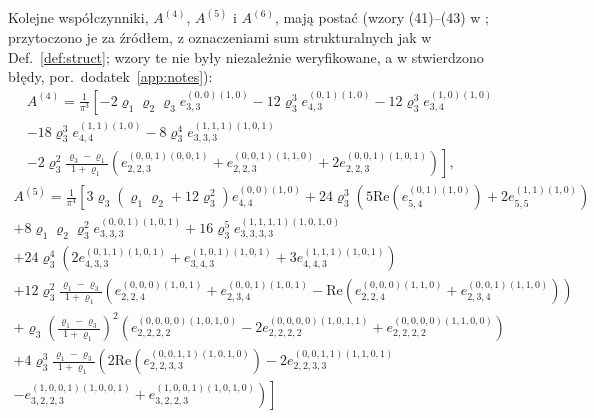 \documentclass[12pt,a4paper,twoside,openright]{report}
\theoremstyle{definition}
\theoremstyle{remark}
\begin{document}
Kolejne współczynniki, $A^{(4)}$, $A^{(5)}$ i $A^{(6)}$, mają postać (wzory (41)--(43) w \cite{czapla2025computational}; przytoczono je za źródłem, z oznaczeniami sum strukturalnych jak w Def.~\ref{def:struct}; wzory te nie były niezależnie weryfikowane, a w \cite{czapla2025computational} stwierdzono błędy, por.\ dodatek~\ref{app:notes}):
\begin{multline}\label{eq:A4}
A^{(4)} =
\frac{1}{ \pi^3}  \left[
-2\varrho_1\varrho_2\varrho_3 e_{3,3}^{(0,0)(1,0)}
-12\varrho_3^3 e_{4,3}^{(0,1)(1,0)}-12\varrho_3^3 e_{3,4}^{(1,0)(1,0)}
\right. \\ \left.
-18\varrho_3^3  e_{4,4}^{(1,1)(1,0)} -8\varrho_3^4  e_{3,3,3}^{(1,1,1)(1,0,1)}
\right. \\ \left.
-2\varrho_3^2\frac{\varrho_3-\varrho_1}{1+\varrho_1} \left(e_{2,2,3}^{(0,0,1)(0,0,1)}
+ e_{2,2,3}^{(0,0,1)(1,1,0)}
+2 e_{2,2,3}^{(0,0,1)(1,0,1)}
\right)
\right],
\end{multline}
\begin{multline}\label{eq:A5}
A^{(5)} = \frac{1}{ \pi^4} \left[
3\varrho_3(\varrho_1\varrho_2+12\varrho_3^2)e_{4,4}^{(0,0)(1,0)}
\right.
+24\varrho_3^3\left(5\mathrm{Re} \left(e_{5,4}^{(0,1)(1,0)}\right)
+2e_{5,5}^{(1,1)(1,0)}\right)
\\
+8\varrho_{1}\varrho_2\varrho_3^2
e_{3,3,3}^{(0,0,1)(1,0,1)} +16\varrho_3^5e_{3,3,3,3}^{(1,1,1,1)(1,0,1,0)}
\\
+24\varrho_3^4
\left(2e_{4,3,3}^{(0,1,1)(1,0,1)}
+e_{3,4,3}^{(1,0,1)(1,0,1)}
+3e_{4,4,3}^{(1,1,1)(1,0,1)}
\right)
\\
+12\varrho_3^2\frac{\varrho_1-\varrho_3}{1+\varrho_1}
\left( e_{2,2,4}^{(0,0,0)(1,0,1)}
+ e_{2,3,4}^{(0,0,1)(1,0,1)}
-\mathrm{Re}\left(e_{2,2,4}^{(0,0,0)(1,1,0)}
+e_{2,3,4}^{(0,0,1)(1,1,0)}\right)
\right)
\\
+\varrho_3\left(\frac{\varrho_1-\varrho_3}{1+\varrho_1}\right)^2 \left(
e_{2,2,2,2}^{(0,0,0,0)(1,0,1,0)}
-2e_{2,2,2,2}^{(0,0,0,0)(1,0,1,1)}
+e_{2,2,2,2}^{(0,0,0,0)(1,1,0,0)}
\right)
\\
+4\varrho_3^3\frac{\varrho_1-\varrho_3}{1+\varrho_1}
\left(2 \mathrm{Re}\left( e_{2,2,3,3}^{(0,0,1,1)(1,0,1,0)}\right)
-2e_{2,2,3,3}^{(0,0,1,1)(1,1,0,1)}
\right. \\\left. \left.
-e_{3,2,2,3}^{(1,0,0,1)(1,0,0,1)}
+e_{3,2,2,3}^{(1,0,0,1)(1,0,1,0)}
\right) \right]
\end{multline}
\end{document}
